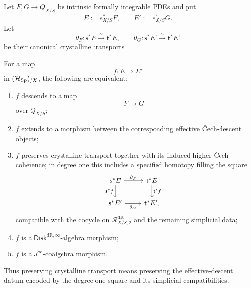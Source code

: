 \begin{proposition}
\label{prop:underlying-object-detects-intrinsic-morphisms}
Let \(F,G\to Q_{X/S}\) be intrinsic formally integrable PDEs and put
\[
  E:=e_{X/S}^*F,
  \qquad
  E':=e_{X/S}^*G.
\]
Let
\[
  \theta_F:\mathsf s^*E\xrightarrow{\simeq}\mathsf t^*E,
  \qquad
  \theta_G:\mathsf s^*E'\xrightarrow{\simeq}\mathsf t^*E'
\]
be their canonical crystalline transports.

For a map
\[
  f:E\to E'
\]
in \((\mathcal H_{\operatorname{Sp}})_{/X}\), the following are equivalent:
\begin{enumerate}
\item \(f\) descends to a map
\[
  F\to G
\]
over \(Q_{X/S}\);
\item \(f\) extends to a morphism between the corresponding effective
\v{C}ech-descent objects;
\item \(f\) preserves crystalline transport together with its induced higher
\v{C}ech coherence; in degree one this includes a specified homotopy filling
the square
\[
\begin{tikzcd}
\mathsf s^*E \ar[r,"\theta_F"] \ar[d,"\mathsf s^*f"']
  & \mathsf t^*E \ar[d,"\mathsf t^*f"]\\
\mathsf s^*E' \ar[r,"\theta_G"']
  & \mathsf t^*E',
\end{tikzcd}
\]
compatible with the cocycle on
\(\mathcal R^{\mathrm{dR}}_{X/S,2}\) and the remaining simplicial data;
\item \(f\) is a \(\mathsf{Disk}^{\mathrm{dR},\infty}\)-algebra morphism;
\item \(f\) is a \(J^\infty\)-coalgebra morphism.
\end{enumerate}
Thus preserving crystalline transport means preserving the effective-descent
datum encoded by the degree-one square and its simplicial compatibilities.
\end{proposition}

